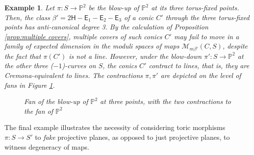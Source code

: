 \documentclass[12pt]{amsart}
\def\cM{{\mathcal{M}}}
\def\E{\mathsf{E}}
\def\H{\mathsf{H}}
\def\P{\mathbb{P}}
\newtheorem{example}[definition]{Example}
\begin{document}
\begin{example}
 Let $\pi:S\to\P^2$ be the blow-up of $\P^2$ at its three torus-fixed points. Then, the class $\beta'=2\H-\E_1-\E_2-\E_3$ of a conic $C'$ through the three torus-fixed points has anti-canonical degree 3. By the calculation of Proposition \ref{prop:multiple covers}, multiple covers of such conics $C'$ may fail to move in a family of expected dimension in the moduli spaces of maps $\cM_{m\beta'}(C,S)$, despite the fact that $\pi(C')$ is not a line. However, under the blow-down $\pi':S\to\P^2$ at the other three ($-1$)-curves on $S$, the conics $C'$ contract to lines, that is, they are Cremona-equivalent to lines. The contractions $\pi,\pi'$ are depicted on the level of fans in Figure \ref{fig:cremona}.
\begin{figure}[H]
    \begin{center}
    \end{center}
    \caption{Fan of the blow-up of $\mathbb{P}^2$ at three points, with the two contractions to the fan of $\mathbb{P}^2$}\label{fig:cremona}
\end{figure}


\end{example}

The final example illustrates the necessity of considering toric morphisms $\pi:S\to S'$ to \emph{fake} projective planes, as opposed to just projective planes, to witness degeneracy of maps.
\end{document}

